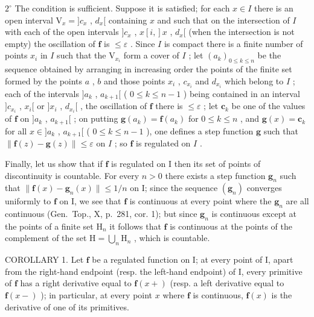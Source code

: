 \(2^{\circ}\) The condition is sufficient. Suppose it is satisfied; for each \(x \in I\) there is an open interval \(\mathrm{V}_x = ]c_x\) , \(d_x[\) containing \(x\) and such that on the intersection of \(I\) with each of the open intervals \(]c_x\) , \(x[i, ]x\) , \(d_x[\) (when the intersection is not empty) the oscillation of \(\mathbf{f}\) is \(\leqslant \varepsilon\) . Since \(I\) is compact there is a finite number of points \(x_i\) in \(I\) such that the \(\mathrm{V}_{x_i}\) form a cover of \(I\) ; let \((a_k)_{0 \leqslant k \leqslant n}\) be the sequence obtained by arranging in increasing order the points of the finite set formed by the points \(a\) , \(b\) and those points \(x_i\) , \(c_{x_i}\) and \(d_{x_i}\) which belong to \(I\) ; each of the intervals \(]a_k\) , \(a_{k+1}[\) ( \(0 \leqslant k \leqslant n-1\) ) being contained in an interval \(]c_{x_i}\) , \(x_i[\) or \(]x_i\) , \(d_{x_i}[\) , the oscillation of \(\mathbf{f}\) there is \(\leqslant \varepsilon\) ; let \(\mathbf{c}_k\) be one of the values of \(\mathbf{f}\) on \(]a_k\) , \(a_{k+1}[\) ; on putting \(\mathbf{g}(a_k) = \mathbf{f}(a_k)\) for \(0 \leqslant k \leqslant n\) , and \(\mathbf{g}(x) = \mathbf{c}_k\) for all \(x \in ]a_k\) , \(a_{k+1}[\) ( \(0 \leqslant k \leqslant n-1\) ), one defines a step function \(\mathbf{g}\) such that \(\| \mathbf{f}(z) - \mathbf{g}(z) \| \leqslant \varepsilon\) on \(I\) ; so \(\mathbf{f}\) is regulated on \(I\) .

Finally, let us show that if \(\mathbf{f}\) is regulated on I then its set of points of discontinuity is countable. For every \(n > 0\) there exists a step function \(\mathbf{g}_n\) such that \(\| \mathbf{f}(x) - \mathbf{g}_n(x)\| \leqslant 1 / n\) on I; since the sequence \((\mathbf{g}_n)\) converges uniformly to \(\mathbf{f}\) on I, we see that \(\mathbf{f}\) is continuous at every point where the \(\mathbf{g}_n\) are all continuous (Gen.~Top., X, p.~281, cor. 1); but since \(\mathbf{g}_n\) is continuous except at the points of a finite set \(\mathrm{H}_n\) it follows that \(\mathbf{f}\) is continuous at the points of the complement of the set \(\mathrm{H} = \bigcup_{n}\mathrm{H}_{n}\) , which is countable.

COROLLARY 1. Let \(\mathbf{f}\) be a regulated function on I; at every point of I, apart from the right-hand endpoint (resp. the left-hand endpoint) of I, every primitive of \(\mathbf{f}\) has a right derivative equal to \(\mathbf{f}(x+)\) (resp. a left derivative equal to \(\mathbf{f}(x-)\) ); in particular, at every point \(x\) where \(\mathbf{f}\) is continuous, \(\mathbf{f}(x)\) is the derivative of one of its primitives.

